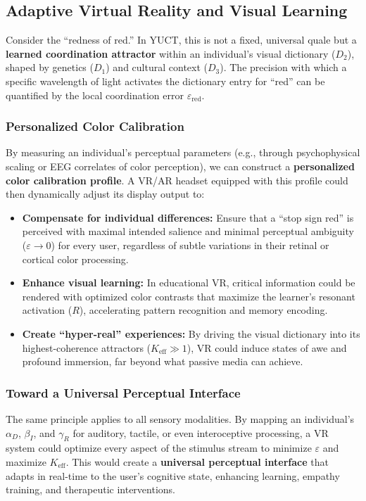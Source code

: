 \documentclass[12pt,a4paper]{article}
\begin{document}
	\subsection{Adaptive Virtual Reality and Visual Learning}
	
	Consider the ``redness of red.'' In YUCT, this is not a fixed, universal quale but a \textbf{learned coordination attractor} within an individual's visual dictionary (\(D_2\)), shaped by genetics (\(D_1\)) and cultural context (\(D_3\)). The precision with which a specific wavelength of light activates the dictionary entry for ``red'' can be quantified by the local coordination error \(\varepsilon_{\text{red}}\).
	
	\subsubsection{Personalized Color Calibration}
	By measuring an individual's perceptual parameters (e.g., through psychophysical scaling or EEG correlates of color perception), we can construct a \textbf{personalized color calibration profile}. A VR/AR headset equipped with this profile could then dynamically adjust its display output to:
	\begin{itemize}
		\item \textbf{Compensate for individual differences:} Ensure that a ``stop sign red'' is perceived with maximal intended salience and minimal perceptual ambiguity (\(\varepsilon \to 0\)) for every user, regardless of subtle variations in their retinal or cortical color processing.
		\item \textbf{Enhance visual learning:} In educational VR, critical information could be rendered with optimized color contrasts that maximize the learner's resonant activation (\(R\)), accelerating pattern recognition and memory encoding.
		\item \textbf{Create ``hyper-real'' experiences:} By driving the visual dictionary into its highest-coherence attractors (\(K_{\mathrm{eff}} \gg 1\)), VR could induce states of awe and profound immersion, far beyond what passive media can achieve.
	\end{itemize}
	
	\subsubsection{Toward a Universal Perceptual Interface}
	The same principle applies to all sensory modalities. By mapping an individual's \(\alpha_D\), \(\beta_I\), and \(\gamma_R\) for auditory, tactile, or even interoceptive processing, a VR system could optimize every aspect of the stimulus stream to minimize \(\varepsilon\) and maximize \(K_{\mathrm{eff}}\). This would create a \textbf{universal perceptual interface} that adapts in real-time to the user's cognitive state, enhancing learning, empathy training, and therapeutic interventions.
	
\end{document}
